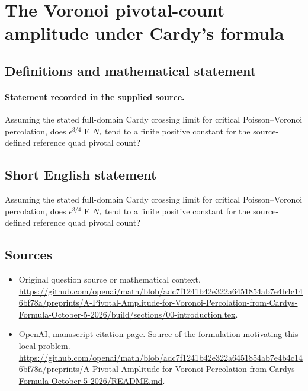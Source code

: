 \documentclass[11pt]{article}
\begin{document}
\section*{The Voronoi pivotal-count amplitude under Cardy’s formula}\label{30007407}
\subsection{Definitions and mathematical statement}
\paragraph{Statement recorded in the supplied source.}
Assuming the stated full-domain Cardy crossing limit for critical Poisson–Voronoi percolation, does $\epsilon ^{3/4}$ E $N_\epsilon $ tend to a finite positive constant for the source-defined reference quad pivotal count?
\subsection{Short English statement}
Assuming the stated full-domain Cardy crossing limit for critical Poisson–Voronoi percolation, does $\epsilon ^{3/4}$ E $N_\epsilon $ tend to a finite positive constant for the source-defined reference quad pivotal count?
\subsection{Sources}
\begin{itemize}
\item[S1] Original question source or mathematical context.
\url{https://github.com/openai/math/blob/adc7f1241b42e322a6451854ab7e4b4c146bf78a/preprints/A-Pivotal-Amplitude-for-Voronoi-Percolation-from-Cardys-Formula-October-5-2026/build/sections/00-introduction.tex}.
\item[S2] OpenAI, manuscript citation page. Source of the formulation motivating this local problem.
\url{https://github.com/openai/math/blob/adc7f1241b42e322a6451854ab7e4b4c146bf78a/preprints/A-Pivotal-Amplitude-for-Voronoi-Percolation-from-Cardys-Formula-October-5-2026/README.md}.
\end{itemize}
\end{document}
